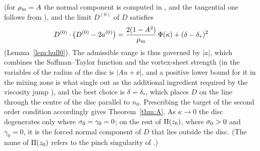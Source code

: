 (for $\rho_{\mathrm m}=A$ the normal component is computed in \cite[(7.11) and the proof of Prop.~7.4]{LM26}, and the tangential one follows from \cite[(3.7b)]{LM26}), and the limit $D^{(0)}$ of $D$ satisfies
\[
D^{(0)}\cdot\big(D^{(0)}-2a^{(0)}\big)=\frac{2(1-A^2)}{\mu_{\mathrm m}}\,\Phi(\kappa)+(\delta-\delta_*)^2
\]
(Lemma~\ref{lem:hull0}). The admissible range is thus governed by $|a|$, which combines the Saffman--Taylor function and the vortex-sheet strength (in the variables of \cite{LM26} the
radius of the disc is $|Au+\ee|$, and a positive lower bound for it in the mixing zone is what \cite{LM26} single out as the additional ingredient required by the viscosity jump
\cite[Secs.~3.3.4 and~7.3]{LM26}), and the best choice is $\delta=\delta_*$, which
places $D$ on the line through the centre of the disc parallel to $n_0$. Prescribing the target of the second order condition accordingly gives Theorem~\ref{thm:A}. As $\kappa\to0$ the disc
degenerates only where $\sigma_0=\gamma_0=0$; on the rest of $\Pi(z_0)$, where $\sigma_0>0$ and $\gamma_0=0$, it is the forced normal component of $D$ that lies outside the disc. (The name of
$\Pi(z_0)$ refers to the pinch singularity of \cite{Men22}.)

